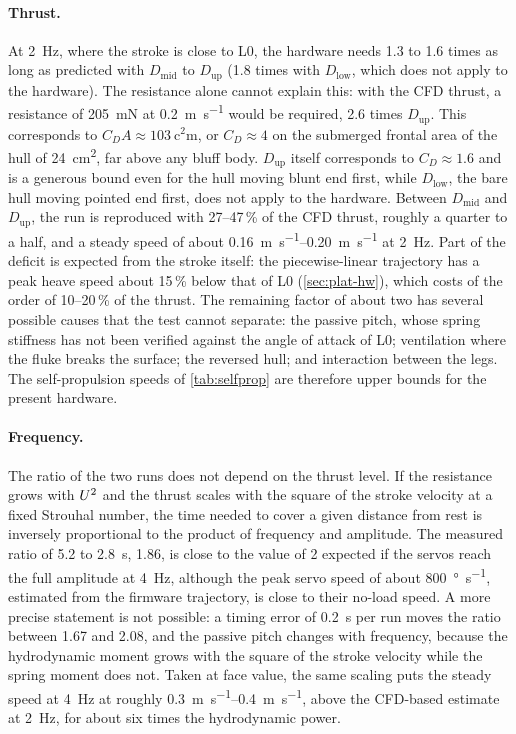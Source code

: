 \paragraph{Thrust.} At \SI{2}{\hertz}, where the stroke is close to L0, the hardware needs 1.3 to 1.6 times as long as predicted with $D_\text{mid}$ to $D_\text{up}$ (1.8 times with $D_\text{low}$, which does not apply to the hardware).
The resistance alone cannot explain this: with the CFD thrust, a resistance of \SI{205}{\milli\newton} at
\SI{0.2}{\metre\per\second} would be required, 2.6 times $D_\text{up}$. This corresponds to $C_DA\approx\SI{103}{\square\centi\metre}$,
or $C_D\approx4$ on the submerged frontal area of the hull of \SI{24}{\square\centi\metre}, far above any bluff body. $D_\text{up}$
itself corresponds to $C_D\approx1.6$ and is a generous bound even for the hull moving blunt end first, while $D_\text{low}$, the bare
hull moving pointed end first, does not apply to the hardware. Between $D_\text{mid}$ and $D_\text{up}$, the run is reproduced with
27--47\,\% of the CFD thrust, roughly a quarter to a half, and a steady speed of about \SIrange{0.16}{0.20}{\metre\per\second} at
\SI{2}{\hertz}. Part of the deficit is expected from the stroke itself: the piecewise-linear trajectory has a peak heave speed about
15\,\% below that of L0 (\cref{sec:plat-hw}), which costs of the order of 10--20\,\% of the thrust. The remaining factor of about two
has several possible causes that the test cannot separate: the passive pitch, whose spring stiffness has not been verified against the
angle of attack of L0; ventilation where the fluke breaks the surface; the reversed hull; and interaction between the legs. The
self-propulsion speeds of \cref{tab:selfprop} are therefore upper bounds for the present hardware.

\paragraph{Frequency.} The ratio of the two runs does not depend on the thrust level. If the resistance grows with $U^2$ and the
thrust scales with the square of the stroke velocity at a fixed Strouhal number, the time needed to cover a given distance from
rest is inversely proportional to the product of frequency and amplitude. The measured ratio of \SI{5.2}{} to \SI{2.8}{\second},
1.86, is close to the value of 2 expected if the servos reach the full amplitude at \SI{4}{\hertz}, although the peak servo speed of about \SI{800}{\degree\per\second}, estimated from the firmware trajectory, is close to their no-load speed. A more precise statement is not possible: a timing error of
\SI{0.2}{\second} per run moves the ratio between 1.67 and 2.08, and the passive pitch changes with frequency, because the
hydrodynamic moment grows with the square of the stroke velocity while the spring moment does not. Taken at face value, the same
scaling puts the steady speed at \SI{4}{\hertz} at roughly \SIrange{0.3}{0.4}{\metre\per\second}, above the CFD-based estimate at
\SI{2}{\hertz}, for about six times the hydrodynamic power.

